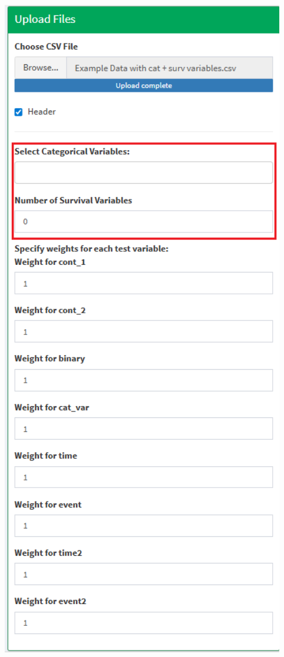 \documentclass[
]{article}
\begin{document}
\begin{center}\includegraphics[width=5.46in]{QC Tutorial variable selection} \end{center}
\end{document}
